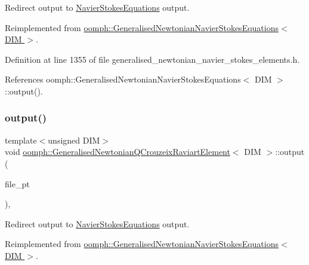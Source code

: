Redirect output to \hyperlink{classoomph_1_1NavierStokesEquations}{Navier\+Stokes\+Equations} output. 



Reimplemented from \hyperlink{classoomph_1_1GeneralisedNewtonianNavierStokesEquations_aadb72645b2396e206fc7765114364095}{oomph\+::\+Generalised\+Newtonian\+Navier\+Stokes\+Equations$<$ D\+I\+M $>$}.



Definition at line 1355 of file generalised\+\_\+newtonian\+\_\+navier\+\_\+stokes\+\_\+elements.\+h.



References oomph\+::\+Generalised\+Newtonian\+Navier\+Stokes\+Equations$<$ D\+I\+M $>$\+::output().

\mbox{\label{classoomph_1_1GeneralisedNewtonianQCrouzeixRaviartElement_a5229c52c67179de461423ab34d7f8a7d}} 
\subsubsection{\texorpdfstring{output()}{output()}\hspace{0.1cm}{\footnotesize\ttfamily [3/4]}}
{\footnotesize\ttfamily template$<$unsigned D\+IM$>$ \\
void \hyperlink{classoomph_1_1GeneralisedNewtonianQCrouzeixRaviartElement}{oomph\+::\+Generalised\+Newtonian\+Q\+Crouzeix\+Raviart\+Element}$<$ D\+IM $>$\+::output (\begin{DoxyParamCaption}\item[{F\+I\+LE $\ast$}]{file\+\_\+pt }\end{DoxyParamCaption})\hspace{0.3cm}{\ttfamily [inline]}, {\ttfamily [virtual]}}



Redirect output to \hyperlink{classoomph_1_1NavierStokesEquations}{Navier\+Stokes\+Equations} output. 



Reimplemented from \hyperlink{classoomph_1_1GeneralisedNewtonianNavierStokesEquations_a0f56934ff2c1092a8e9bc457c93bf8cb}{oomph\+::\+Generalised\+Newtonian\+Navier\+Stokes\+Equations$<$ D\+I\+M $>$}.



